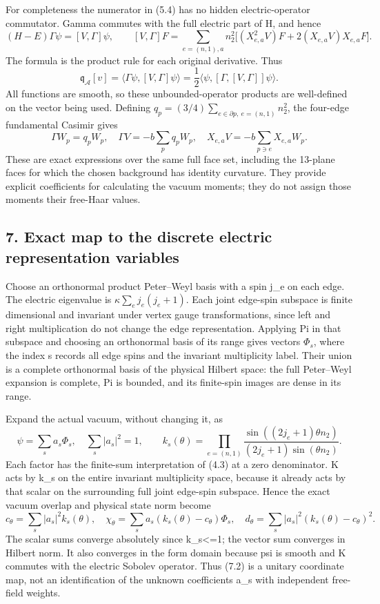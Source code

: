 \documentclass[
  11pt,
]{article}
\begin{document}
For completeness the numerator in (5.4) has no hidden electric-operator
commutator. Gamma commutes with the full electric part of H, and hence
\[
 (H-E)\Gamma\psi=[V,\Gamma]\psi,
\qquad
 [V,\Gamma]F
 =\sum_{e=(n,1),a}n_2^2
       \bigl[(X_{e,a}^2V)F+2(X_{e,a}V)X_{e,a}F\bigr].
\tag{6.1}
\] The formula is the product rule for each original derivative. Thus \[
 \mathfrak q_{\mathcal A}[v]
 =\langle\Gamma\psi,[V,\Gamma]\psi\rangle
 =\frac12\langle\psi,[\Gamma,[V,\Gamma]]\psi\rangle.
\tag{6.2}
\] All functions are smooth, so these unbounded-operator products are
well-defined on the vector being used. Defining
\(q_p=(3/4)\sum_{e\in\partial p,\ e=(n,1)}n_2^2\), the four-edge
fundamental Casimir gives \[
 \Gamma W_p=q_pW_p,\quad
 \Gamma V=-b\sum_pq_pW_p,\quad
 X_{e,a}V=-b\sum_{p\ni e}X_{e,a}W_p.
\tag{6.3}
\] These are exact expressions over the same full face set, including
the 13-plane faces for which the chosen background has identity
curvature. They provide explicit coefficients for calculating the vacuum
moments; they do not assign those moments their free-Haar values.

\subsection{7. Exact map to the discrete electric representation
variables}\label{magnetic-part-1-exact-map-to-the-discrete-electric-representation-variables}

Choose an orthonormal product Peter--Weyl basis with a spin j\_e on each
edge. The electric eigenvalue is \(\kappa\sum_ej_e(j_e+1)\). Each joint
edge-spin subspace is finite dimensional and invariant under vertex
gauge transformations, since left and right multiplication do not change
the edge representation. Applying Pi in that subspace and choosing an
orthonormal basis of its range gives vectors \(\Phi_s\), where the index
s records all edge spins and the invariant multiplicity label. Their
union is a complete orthonormal basis of the physical Hilbert space: the
full Peter--Weyl expansion is complete, Pi is bounded, and its
finite-spin images are dense in its range.

Expand the actual vacuum, without changing it, as \[
 \psi=\sum_s a_s\Phi_s,\quad \sum_s|a_s|^2=1,\qquad
 k_s(\theta)=\prod_{e=(n,1)}
 \frac{\sin((2j_e+1)\theta n_2)}{(2j_e+1)\sin(\theta n_2)}.
\tag{7.1}
\] Each factor has the finite-sum interpretation of (4.3) at a zero
denominator. K acts by k\_s on the entire invariant multiplicity space,
because it already acts by that scalar on the surrounding full joint
edge-spin subspace. Hence the exact vacuum overlap and physical state
norm become \[
 c_\theta=\sum_s|a_s|^2k_s(\theta),\quad
 \chi_\theta=\sum_s a_s(k_s(\theta)-c_\theta)\Phi_s,
\quad
 d_\theta=\sum_s|a_s|^2(k_s(\theta)-c_\theta)^2.
\tag{7.2}
\] The scalar sums converge absolutely since
\textbar k\_s\textbar\textless=1; the vector sum converges in Hilbert
norm. It also converges in the form domain because psi is smooth and K
commutes with the electric Sobolev operator. Thus (7.2) is a unitary
coordinate map, not an identification of the unknown coefficients a\_s
with independent free-field weights.
\end{document}

